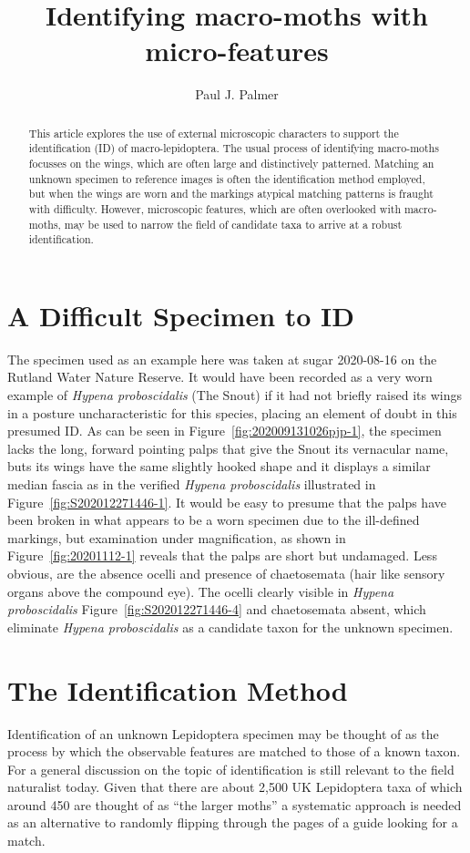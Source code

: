 \documentclass[]{article}
\title{Identifying macro-moths with micro-features}
\author{Paul J. Palmer}
\begin{document}
\maketitle

\begin{abstract}

This article explores the use of external microscopic characters to support the identification (ID) of  macro-lepidoptera. The usual process of identifying macro-moths  focusses on the wings, which are often large and distinctively patterned. Matching an unknown specimen to reference images is often the identification method employed, but when the wings are worn and the markings atypical matching patterns is fraught with difficulty.
 However, microscopic features, which are often overlooked with macro-moths, may be used to narrow the field of candidate taxa to arrive at a robust identification. 

\end{abstract}

\section*{A Difficult Specimen to ID}
The specimen used as an example here was taken at sugar 2020-08-16 on the Rutland Water Nature Reserve. It would have been recorded as a very worn example of \textit{Hypena proboscidalis} (The Snout) if it had not briefly raised its wings in a posture uncharacteristic for this species, placing an element of doubt in this presumed ID. As can be seen in Figure~\ref{fig:202009131026pjp-1}, the specimen lacks the long, forward pointing palps that give the Snout its vernacular name, buts its wings have the same slightly hooked shape  and it displays a similar median fascia as in the verified \textit{Hypena proboscidalis} illustrated in  Figure~\ref{fig:S202012271446-1}.  It would be easy to presume that the palps have been broken in what appears to be a worn specimen due to the ill-defined markings, but examination under magnification, as shown in  Figure~\ref{fig:20201112-1} reveals that the palps are short but undamaged. Less obvious,  are the absence ocelli and presence of chaetosemata (hair like sensory organs above the compound eye). The ocelli clearly visible in \textit{Hypena proboscidalis} Figure~\ref{fig:S202012271446-4} and chaetosemata absent,  which  eliminate \textit{Hypena proboscidalis} as a candidate taxon for the unknown specimen.

\section*{The Identification Method}
Identification of an unknown Lepidoptera specimen may be thought of as the process by which the  observable features are matched to those of a known taxon.
For a general discussion on the topic of identification \cite{Pankhurst1978} is still relevant to the field naturalist today.
 Given that there are about 2,500 UK Lepidoptera taxa of which around 450 are thought of as \enquote{the larger moths} a systematic approach is needed as an alternative to randomly flipping through the pages of a guide looking for a match.
 
\end{document}
